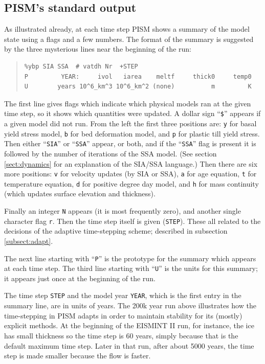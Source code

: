 \documentclass[11pt,final]{amsart}
\renewcommand{\t}[1]{\texttt{#1}}
\begin{document}
\subsection{PISM's standard output}   As illustrated already, at each time step PISM shows a summary of the model state using a flags and a few numbers.  The format of the summary is suggested by the three mysterious lines near the beginning of the run:

\small\begin{quote}
\begin{verbatim}
%ybp SIA SSA  # vatdh Nr  +STEP
P         YEAR:     ivol   iarea    meltf     thick0     temp0
U        years 10^6_km^3 10^6_km^2 (none)          m         K
\end{verbatim}
\end{quote}\normalsize

\noindent The first line gives flags which indicate which physical models ran at the given time step, so it shows which quantities were updated.  A dollar sign ``\t{\$}'' appears if a given model did not run.  From the left the first three positions are: \t{y} for basal yield stress model, \t{b} for bed deformation model, and \t{p} for plastic till yield stress.  Then either ``\verb|SIA|'' or ``\verb|SSA|'' appear, or both, and if the ``\verb|SSA|'' flag is present it is followed by the number of iterations of the SSA model.  (See section \ref{sect:dynamics} for an explanation of the SIA/SSA language.)  Then there are six more positions: \t{v} for velocity updates (by SIA or SSA), \t{a} for age equation, \t{t} for temperature equation, \t{d} for positive degree day model, and \t{h} for mass continuity (which updates surface elevation and thickness).  

Finally an integer \t{N} appears (it is most frequently zero), and another single character flag \t{r}.  Then the time step itself is given (\t{STEP}).  These all related to the decisions of the adaptive time-stepping scheme; described in subsection \ref{subsect:adapt}.

The next line starting with ``\t{P}'' is the prototype for the summary which appears at each time step.  The third line starting with ``\t{U}'' is the units for this summary; it appears just once at the beginning of the run.

The time step \t{STEP} and the model year \t{YEAR}, which is the first entry in the summary line, are in units of years.  The 200k year run above illustrates how the time-stepping in PISM adapts in order to maintain stability for its (mostly) explicit methods.  At the beginning of the EISMINT II run, for instance, the ice has small thickness so the time step is 60 years, simply because that is the default maximum time step.  Later in that run, after about 5000 years, the time step is made smaller because the flow is faster.
\end{document}
